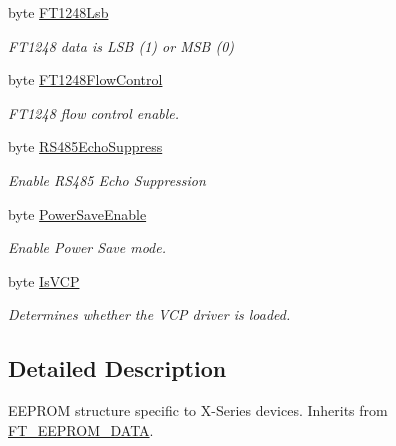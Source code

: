 \begin{DoxyCompactItemize}
byte \mbox{\hyperlink{class_f_t_d2_x_x___n_e_t_1_1_f_t_d_i_1_1_f_t___x_s_e_r_i_e_s___e_e_p_r_o_m___s_t_r_u_c_t_u_r_e_a53d08de51ecc4798b88628593c74d9ce}{F\+T1248\+Lsb}}
\begin{DoxyCompactList}\small\item\em F\+T1248 data is L\+SB (1) or M\+SB (0) \end{DoxyCompactList}\item 
byte \mbox{\hyperlink{class_f_t_d2_x_x___n_e_t_1_1_f_t_d_i_1_1_f_t___x_s_e_r_i_e_s___e_e_p_r_o_m___s_t_r_u_c_t_u_r_e_a24da3bc4e8f99ea119c5454669cf58be}{F\+T1248\+Flow\+Control}}
\begin{DoxyCompactList}\small\item\em F\+T1248 flow control enable. \end{DoxyCompactList}\item 
byte \mbox{\hyperlink{class_f_t_d2_x_x___n_e_t_1_1_f_t_d_i_1_1_f_t___x_s_e_r_i_e_s___e_e_p_r_o_m___s_t_r_u_c_t_u_r_e_aae4dd9a2469310ddb91cd46893a71b05}{R\+S485\+Echo\+Suppress}}
\begin{DoxyCompactList}\small\item\em Enable R\+S485 Echo Suppression \end{DoxyCompactList}\item 
byte \mbox{\hyperlink{class_f_t_d2_x_x___n_e_t_1_1_f_t_d_i_1_1_f_t___x_s_e_r_i_e_s___e_e_p_r_o_m___s_t_r_u_c_t_u_r_e_ad5098e631cb4242bb6b8c14085430047}{Power\+Save\+Enable}}
\begin{DoxyCompactList}\small\item\em Enable Power Save mode. \end{DoxyCompactList}\item 
byte \mbox{\hyperlink{class_f_t_d2_x_x___n_e_t_1_1_f_t_d_i_1_1_f_t___x_s_e_r_i_e_s___e_e_p_r_o_m___s_t_r_u_c_t_u_r_e_abcacd5ce94b61cffcaf2ca7a795fc577}{Is\+V\+CP}}
\begin{DoxyCompactList}\small\item\em Determines whether the V\+CP driver is loaded. \end{DoxyCompactList}\end{DoxyCompactItemize}


\subsection{Detailed Description}
E\+E\+P\+R\+OM structure specific to X-\/\+Series devices. Inherits from \mbox{\hyperlink{class_f_t_d2_x_x___n_e_t_1_1_f_t_d_i_1_1_f_t___e_e_p_r_o_m___d_a_t_a}{F\+T\+\_\+\+E\+E\+P\+R\+O\+M\+\_\+\+D\+A\+TA}}. 



